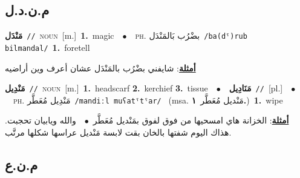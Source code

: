 \documentclass[10pt,a4paper,twoside]{article} %
\begin{document}
\begin{multicols}{2}
\vspace{-3mm}
\subsection*{\color{blue}\foreignlanguage{arabic}{م.ن.د.ل}\color{blue}{}} 

{\setlength\topsep{0pt}\textbf{\foreignlanguage{arabic}{مَنْدَل}}\ {\color{gray}\texttt{//}\color{black}}\ \textsc{noun}\ [m.]\ \textbf{1.}~magic\ \ $\bullet$\ \ \textsc{ph.} \color{gray} \foreignlanguage{arabic}{بضْرُب بَالمَنْدَل}\color{black}\ {\color{gray}\texttt{/{\sffamily ba(dˤ)rub bilmandal}/}\color{black}}\ \textbf{1.}~foretell\  \begin{flushright}\color{gray}\foreignlanguage{arabic}{\textbf{\underline{\foreignlanguage{arabic}{أمثلة}}}: شايفني بضْرُب بالمَنْدَل عشان أعرف وين أراضيه}\end{flushright}\color{black}} \vspace{2mm}

{\setlength\topsep{0pt}\textbf{\foreignlanguage{arabic}{مَنْدِيل}}\ {\color{gray}\texttt{//}\color{black}}\ \textsc{noun}\ [m.]\ \textbf{1.}~headscarf  \textbf{2.}~kerchief  \textbf{3.}~tissue\ \ $\bullet$\ \ \setlength\topsep{0pt}\textbf{\foreignlanguage{arabic}{مَنَادِيل}}\ {\color{gray}\texttt{//}\color{black}}\ [pl.]\ \ $\bullet$\ \ \textsc{ph.} \color{gray} \foreignlanguage{arabic}{مَنْدِيل مُعَطَّر}\color{black}\ {\color{gray}\texttt{/{\sffamily mandiːl muʕatˤtˤar}/}\color{black}}\ \color{gray} (msa. \foreignlanguage{arabic}{مَنْديل مُعَطَّر}~\foreignlanguage{arabic}{\textbf{١.}})\color{black}\ \textbf{1.}~wipe\  \begin{flushright}\color{gray}\foreignlanguage{arabic}{\textbf{\underline{\foreignlanguage{arabic}{أمثلة}}}: الخزانة هاي امسحيها من فوق لفوق بمَنْديل مُعَطَّر\ $\bullet$\ \  والله ويابيان تحجبت. هذاك اليوم شفتها بالخان بقت لابسة مَنْديل عراسها شكلها مرتَّب.}\end{flushright}\color{black}} \vspace{2mm}

\vspace{-3mm}
\subsection*{\color{blue}\foreignlanguage{arabic}{م.ن.ع}\color{blue}{}} 


\end{multicols}
\end{document}
